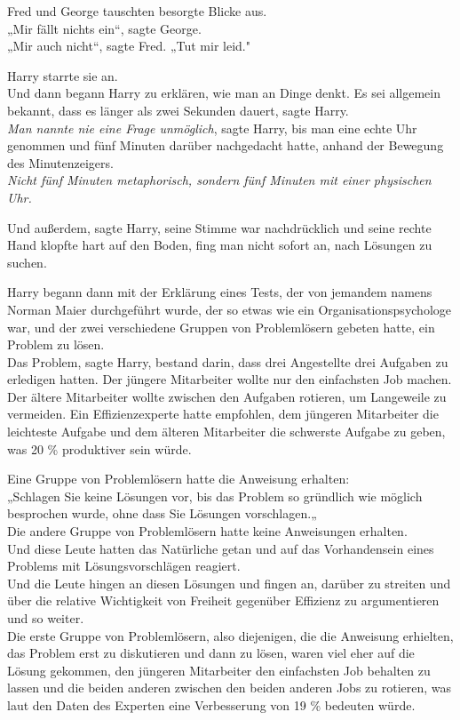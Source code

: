 {Fred und George tauschten besorgte Blicke aus.\\ „Mir fällt nichts ein“, sagte George.\\ „Mir auch nicht“, sagte Fred. „Tut mir leid."

Harry starrte sie an.\\ Und dann begann Harry zu erklären, wie man an Dinge denkt. Es sei allgemein bekannt, dass es länger als zwei Sekunden dauert, sagte Harry.\\ \emph{Man nannte nie eine Frage unmöglich}, sagte Harry, bis man eine echte Uhr genommen und fünf Minuten darüber nachgedacht hatte, anhand der Bewegung des Minutenzeigers.\\ \emph{Nicht fünf Minuten metaphorisch, sondern fünf Minuten mit einer physischen Uhr.}

Und außerdem, sagte Harry, seine Stimme war nachdrücklich und seine rechte Hand klopfte hart auf den Boden, fing man nicht sofort an, nach Lösungen zu suchen.

Harry begann dann mit der Erklärung eines Tests, der von jemandem namens Norman Maier durchgeführt wurde, der so etwas wie ein Organisationspsychologe war, und der zwei verschiedene Gruppen von Problemlösern gebeten hatte, ein Problem zu lösen.\\ Das Problem, sagte Harry, bestand darin, dass drei Angestellte drei Aufgaben zu erledigen hatten. Der jüngere Mitarbeiter wollte nur den einfachsten Job machen.\\ Der ältere Mitarbeiter wollte zwischen den Aufgaben rotieren, um Langeweile zu vermeiden. Ein Effizienzexperte hatte empfohlen, dem jüngeren Mitarbeiter die leichteste Aufgabe und dem älteren Mitarbeiter die schwerste Aufgabe zu geben, was 20 \% produktiver sein würde.

Eine Gruppe von Problemlösern hatte die Anweisung erhalten:\\ „Schlagen Sie keine Lösungen vor, bis das Problem so gründlich wie möglich besprochen wurde, ohne dass Sie Lösungen vorschlagen.„\\ Die andere Gruppe von Problemlösern hatte keine Anweisungen erhalten.\\ Und diese Leute hatten das Natürliche getan und auf das Vorhandensein eines Problems mit Lösungsvorschlägen reagiert.\\ Und die Leute hingen an diesen Lösungen und fingen an, darüber zu streiten und über die relative Wichtigkeit von Freiheit gegenüber Effizienz zu argumentieren und so weiter.\\ Die erste Gruppe von Problemlösern, also diejenigen, die die Anweisung erhielten, das Problem erst zu diskutieren und dann zu lösen, waren viel eher auf die Lösung gekommen, den jüngeren Mitarbeiter den einfachsten Job behalten zu lassen und die beiden anderen zwischen den beiden anderen Jobs zu rotieren, was laut den Daten des Experten eine Verbesserung von 19 \% bedeuten würde.

}
